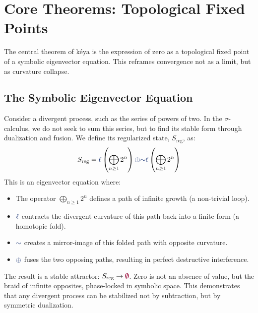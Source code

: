 \section{Core Theorems: Topological Fixed Points}

The central theorem of kéya is the expression of zero as a topological fixed point of a symbolic eigenvector equation. This reframes convergence not as a limit, but as curvature collapse.

\subsection{The Symbolic Eigenvector Equation}
Consider a divergent process, such as the series of powers of two. In the $\sigma$-calculus, we do not seek to sum this series, but to find its stable form through dualization and fusion. We define its regularized state, $S_{\text{reg}}$, as:
\[
S_{\text{reg}} = \lha \left( \bigoplus_{n \geq 1} 2^{n} \right) \fuse \reflec \lha \left( \bigoplus_{n \geq 1} 2^{n} \right)
\]
This is an eigenvector equation where:
\begin{itemize}
    \item The operator $\bigoplus_{n \geq 1} 2^{n}$ defines a path of infinite growth (a non-trivial loop).
    \item $\lha$ contracts the divergent curvature of this path back into a finite form (a homotopic fold).
    \item $\reflec$ creates a mirror-image of this folded path with opposite curvature.
    \item $\fuse$ fuses the two opposing paths, resulting in perfect destructive interference.
\end{itemize}
The result is a stable attractor: $S_{\text{reg}} \to \void$. Zero is not an absence of value, but the braid of infinite opposites, phase-locked in symbolic space. This demonstrates that any divergent process can be stabilized not by subtraction, but by symmetric dualization.

